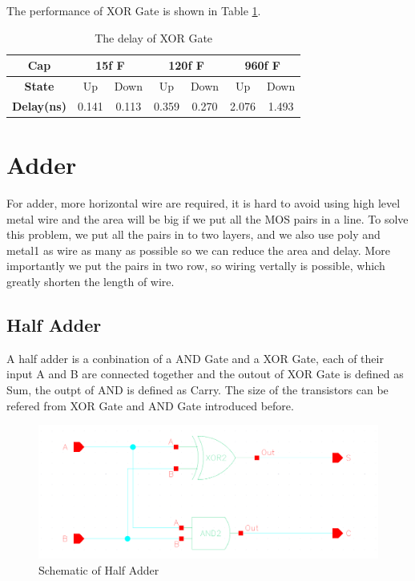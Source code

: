 \documentclass[conference]{IEEEtran}
\begin{document}
The performance of XOR Gate is shown in Table \ref{The delay of XOR}.

\begin{table}[h]
    \caption{The delay of XOR Gate}
    \begin{center}
        \begin{tabular}{|c|c|c|c|c|c|c|}
            \hline
            \textbf{Cap} & \multicolumn{2}{|c|}{15f F} & \multicolumn{2}{|c|}{120f F} & \multicolumn{2}{|c|}{960f F} \\
            \hline
            \textbf{State} & Up & Down & Up & Down & Up & Down \\
            \hline
            \textbf{Delay(ns)} & 0.141 & 0.113 & 0.359 & 0.270 & 2.076 & 1.493 \\
            \hline
        \end{tabular}
    \end{center}
    \label{The delay of XOR}
\end{table}

\section{Adder}

For adder, more horizontal wire are required, it is hard to avoid using high level metal wire and the area will be big if we put all the MOS pairs in a line. To solve this problem, we put all the pairs in to two layers, and we also use poly and metal1 as wire as many as possible so we can reduce the area and delay. More importantly we put the pairs in two row, so wiring vertally is possible, which greatly shorten the length of wire. 

\subsection{Half Adder}


A half adder is a conbination of a AND Gate and a XOR Gate, each of their input A and B are connected together and the outout of XOR Gate is defined as Sum, the outpt of AND is defined as Carry. The size of the transistors can be refered from XOR Gate and AND Gate introduced before.

\begin{figure}[H]
    \centering
    \includegraphics[width = 0.9\linewidth]{half_adder_schematic.png}
    \caption{Schematic of Half Adder}
    \label{Schematic of Half Adder}
\end{figure}
\end{document}
